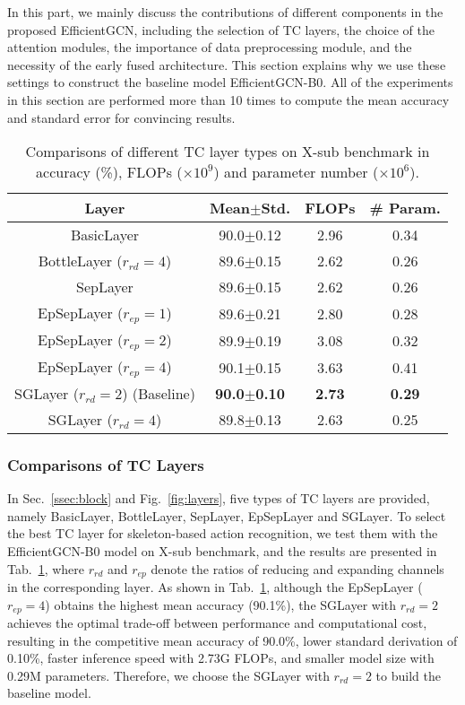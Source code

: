 \documentclass[10pt,journal,compsoc]{IEEEtran}
\begin{document}
In this part, we mainly discuss the contributions of different components in the proposed EfficientGCN, including the selection of TC layers, the choice of the attention modules, the importance of data preprocessing module, and the necessity of the early fused architecture. This section explains why we use these settings to construct the baseline model EfficientGCN-B0. All of the experiments in this section are performed more than 10 times to compute the mean accuracy and standard error for convincing results.

\begin{table}[t]
  \caption{Comparisons of different TC layer types on X-sub benchmark in accuracy (\%), FLOPs ($\times10^9$) and parameter number ($\times10^6$).}
  \label{tab:layer}
  \vspace{-0.4cm}
  \centering
  \setlength{\tabcolsep}{4pt}
  \renewcommand{\arraystretch}{1.2}
  \begin{tabular}{c|ccc}
  \toprule
  Layer & Mean$\pm$Std. & FLOPs & \# Param.\\
  \midrule
  BasicLayer & 90.0$\pm$0.12 & 2.96 & 0.34 \\
  \midrule
  BottleLayer ($r_{rd}=4$) & 89.6$\pm$0.15 & 2.62 & 0.26 \\
  \midrule
  SepLayer & 89.6$\pm$0.15 & 2.62 & 0.26 \\
  \midrule
  EpSepLayer ($r_{ep}=1$) & 89.6$\pm$0.21 & 2.80 & 0.28 \\
  EpSepLayer ($r_{ep}=2$) & 89.9$\pm$0.19 & 3.08 & 0.32 \\
  EpSepLayer ($r_{ep}=4$) & 90.1$\pm$0.15 & 3.63 & 0.41 \\
  \midrule
  SGLayer ($r_{rd}=2$) (Baseline) & {\bf 90.0$\pm$0.10} & {\bf 2.73} & {\bf 0.29} \\
  SGLayer ($r_{rd}=4$) & 89.8$\pm$0.13 & 2.63 & 0.25 \\
  \bottomrule
  \end{tabular}
\end{table}

\subsubsection{Comparisons of TC Layers}
\label{sssec:compare_layer}

In Sec.~\ref{ssec:block} and Fig.~\ref{fig:layers}, five types of TC layers are provided, namely BasicLayer, BottleLayer, SepLayer, EpSepLayer and SGLayer. To select the best TC layer for skeleton-based action recognition, we test them with the EfficientGCN-B0 model on X-sub benchmark, and the results are presented in Tab.~\ref{tab:layer}, where $r_{rd}$ and $r_{ep}$ denote the ratios of reducing and expanding channels in the corresponding layer. As shown in Tab.~\ref{tab:layer}, although the EpSepLayer ($r_{ep}=4$) obtains the highest mean accuracy (90.1\%), the SGLayer with $r_{rd}=2$ achieves the optimal trade-off between performance and computational cost, resulting in the competitive mean accuracy of 90.0\%, lower standard derivation of 0.10\%, faster inference speed with 2.73G FLOPs, and smaller model size with 0.29M parameters. Therefore, we choose the SGLayer with $r_{rd}=2$ to build the baseline model.
\end{document}
